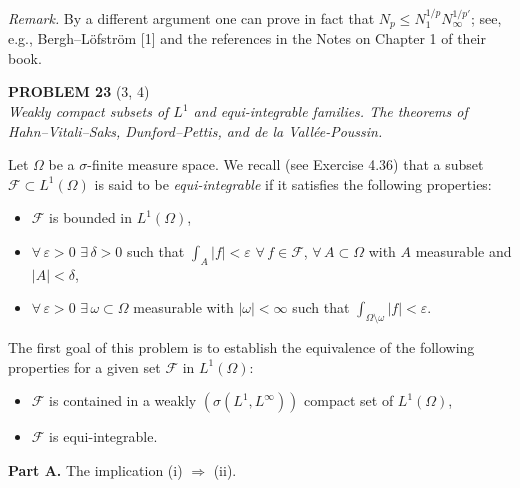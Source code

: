 \documentclass[12pt]{article}
\newcommand{\abs}[1]{\left|#1\right|}
\begin{document}
\noindent\textit{Remark.} By a different argument one can prove in fact that $N_p \le N_1^{1/p}N_\infty^{1/p'}$;
see, e.g., Bergh--L\"{o}fstr\"{o}m [1] and the references in the Notes on Chapter 1 of their book.
 
\bigskip
 
\noindent\textbf{PROBLEM 23} (3, 4)\\[4pt]
\textit{Weakly compact subsets of $L^1$ and equi-integrable families.
The theorems of Hahn--Vitali--Saks, Dunford--Pettis, and de la Vall\'ee-Poussin.}
 
\medskip
 
Let $\Omega$ be a $\sigma$-finite measure space. We recall (see Exercise 4.36) that a subset
$\mathcal{F} \subset L^1(\Omega)$ is said to be \emph{equi-integrable} if it satisfies the following properties:
\begin{itemize}
\item[(a)] $\mathcal{F}$ is bounded in $L^1(\Omega)$,
\item[(b)] $\forall\, \varepsilon > 0$ $\exists\, \delta > 0$ such that $\displaystyle\int_A \abs{f} < \varepsilon$ $\forall\, f \in \mathcal{F}$,
$\forall\, A \subset \Omega$ with $A$ measurable and $\abs{A} < \delta$,
\item[(c)] $\forall\, \varepsilon > 0$ $\exists\, \omega \subset \Omega$ measurable with $\abs{\omega} < \infty$
such that $\displaystyle\int_{\Omega\setminus\omega} \abs{f} < \varepsilon$.
\end{itemize}
 
\noindent The first goal of this problem is to establish the equivalence of the following
properties for a given set $\mathcal{F}$ in $L^1(\Omega)$:
\begin{itemize}
\item[(i)] $\mathcal{F}$ is contained in a weakly $(\sigma(L^1, L^\infty))$ compact set of $L^1(\Omega)$,
\item[(ii)] $\mathcal{F}$ is equi-integrable.
\end{itemize}
 
\noindent\textbf{Part A.} The implication (i) $\Rightarrow$ (ii).
 
\end{document}
